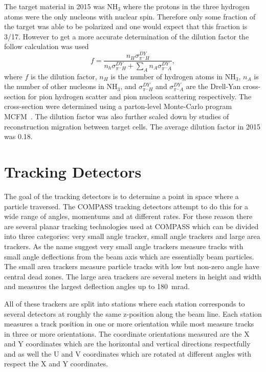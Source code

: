 The target material in 2015 was NH$_3$ where the protons in the three hydrogen
atoms were the only nucleons with nuclear spin.  Therefore only some fraction of
the target was able to be polarized and one would expect that this fraction is
3/17.  However to get a more accurate determination of the dilution factor the
follow calculation was used
\begin{equation}
  f = \frac{n_H\sigma^{DY}_{\pi^-H}}
  {n_h\sigma^{DY}_{\pi^-H} + \sum_A n_A\sigma^{DY}_{\pi^-A}},
\end{equation}
where $f$ is the dilution factor, $n_H$ is the number of hydrogen atoms in
NH$_3$, $n_A$ is the number of other nucleons in NH$_3$, and
$\sigma^{DY}_{\pi^-H}$ and $\sigma^{DY}_{\pi^-A}$ are the Drell-Yan
cross-section for pion hydrogen scatter and pion nucleon scattering
respectively.  The cross-section were determined using a parton-level
Monte-Carlo program MCFM~\cite{MCFM}.  The dilution factor was also further
scaled down by studies of reconstruction migration between target cells.  The
average dilution factor in 2015 was 0.18.


\section{Tracking Detectors} \label{sec::tracking}
The goal of the tracking detectors is to determine a point in space where a
particle traversed.  The COMPASS tracking detectors attempt to do this for a
wide range of angles, momentums and at different rates.  For these reason there
are several planar tracking technologies used at COMPASS which can be divided
into three categories: very small angle tracker, small angle trackers and large
area trackers.  As the name suggest very small angle trackers measure tracks
with small angle deflections from the beam axis which are essentially beam
particles.  The small area trackers measure particle tracks with low but
non-zero angle have central dead zones.  The large area trackers are several
meters in height and width and measures the largest deflection angles up to
180~mrad. \par

All of these trackers are split into stations where each station corresponds to
several detectors at roughly the same z-position along the beam line.  Each
station measures a track position in one or more orientation while most measure
tracks in three or more orientations.  The coordinate orientations measured are
the X and Y coordinates which are the horizontal and vertical directions
respectfully and as well the U and V coordinates which are rotated at different
angles with respect the X and Y coordinates. \par

